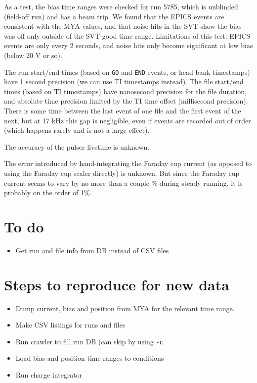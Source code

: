 \documentclass[aps,amsmath,amssymb,notitlepage,10pt,onecolumn]{revtex4-1}
\begin{document}
As a test, the bias time ranges were checked for run 5785, which is unblinded (field-off run) and has a beam trip.
We found that the EPICS events are consistent with the MYA values, and that noise hits in the SVT show the bias was off only outside of the SVT-good time range.
Limitations of this test: EPICS events are only every 2 seconds, and noise hits only become significant at low bias (below 20 V or so).

The run start/end times (based on \texttt{GO} and \texttt{END} events, or head bank timestamps) have 1 second precision (we can use TI timestamps instead).
The file start/end times (based on TI timestamps) have nanosecond precision for the file duration, and absolute time precision limited by the TI time offset (millisecond precision).
There is some time between the last event of one file and the first event of the next, but at 17 kHz this gap is negligible, even if events are recorded out of order (which happens rarely and is not a large effect).

The accuracy of the pulser livetime is unknown.

The error introduced by hand-integrating the Faraday cup current (as opposed to using the Faraday cup scaler directly) is unknown.
But since the Faraday cup current seems to vary by no more than a couple \% during steady running, it is probably on the order of 1\%.

\section{To do}
\begin{itemize}
    \item Get run and file info from DB instead of CSV files
\end{itemize}

\section{Steps to reproduce for new data}
\begin{itemize}
    \item Dump current, bias and position from MYA for the relevant time range.
    \item Make CSV listings for runs and files
    \item Run crawler to fill run DB (can skip by using \texttt{-c}
    \item Load bias and position time ranges to conditions
    \item Run charge integrator
\end{itemize}
\end{document}
